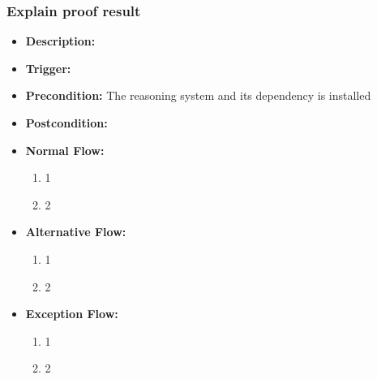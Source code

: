\documentclass[../gr-final.tex]{subfiles}
\begin{document}
\subsubsection{Explain proof result}
\begin{itemize}
  \item {\bfseries Description:} 
  \item {\bfseries Trigger:}
  \item {\bfseries Precondition:} The reasoning system and its
    dependency is installed
    
  \item {\bfseries Postcondition:}

  \item {\bfseries Normal Flow:}
    \begin{enumerate}
      \item 1
      \item 2
    \end{enumerate}
  \item {\bfseries Alternative Flow:}
    \begin{enumerate}
      \item 1
      \item 2
    \end{enumerate}
  \item {\bfseries Exception Flow:}
    \begin{enumerate}
      \item 1
      \item 2
    \end{enumerate}
\end{itemize}
\end{document}
